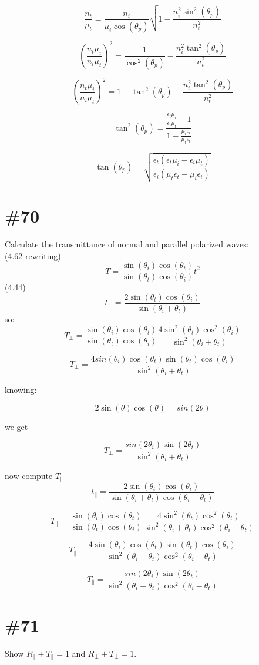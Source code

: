 \documentclass[10pt,a4paper]{article}
\begin{document}
\[\frac{n_t}{\mu_t}=\frac{n_i}{\mu_i\cos(\theta_p)}\sqrt{1-\frac{n_i^2\sin^2(\theta_p)}{n_t^2}}\]

\[(\frac{n_t\mu_i}{n_i\mu_t})^2=\frac{1}{\cos^2(\theta_p)}-\frac{n_i^2\tan^2(\theta_p)}{n_t^2}\]

\[(\frac{n_t\mu_i}{n_i\mu_t})^2=1+\tan^2(\theta_p)-\frac{n_i^2\tan^2(\theta_p)}{n_t^2}\]

\[\tan^2(\theta_p)=\frac{\frac{\epsilon_t\mu_i}{\epsilon_i\mu_t}-1}{1-\frac{\mu_i\epsilon_i}{\mu_t\epsilon_t}}\]

\[\tan(\theta_p)=\sqrt{\frac{\epsilon_t(\epsilon_t\mu_i-\epsilon_i\mu_t)}{\epsilon_i(\mu_t\epsilon_t-\mu_i\epsilon_i)}}\]

\section{\#70}
Calculate the transmittance of normal and parallel polarized waves:\\
(4.62-rewriting)
\[T=\frac{\sin(\theta_i)\cos(\theta_t)}{\sin(\theta_t)\cos(\theta_i)}t^2\]
(4.44)
\[t_\perp=\frac{2\sin(\theta_t)\cos(\theta_i)}{\sin(\theta_i+\theta_t)}\]
so:
\[T_\perp=\frac{\sin(\theta_i)\cos(\theta_t)}{\sin(\theta_t)\cos(\theta_i)}\frac{4\sin^2(\theta_t)\cos^2(\theta_i)}{\sin^2(\theta_i+\theta_t)}\]

\[T_\perp=\frac{4sin(\theta_i)\cos(\theta_t)\sin(\theta_t)\cos(\theta_i)}{\sin^2(\theta_i+\theta_t)}\]

knowing:

\[2\sin(\theta)\cos(\theta)=sin(2\theta)\]

we get

\[T_\perp=\frac{sin(2\theta_i)\sin(2\theta_t)}{\sin^2(\theta_i+\theta_t)}\]

now compute $T_\parallel$
\[t_\parallel=\frac{2\sin(\theta_t)\cos(\theta_i)}{\sin(\theta_i+\theta_t)\cos(\theta_i-\theta_t)}\]

\[T_\parallel=\frac{\sin(\theta_i)\cos(\theta_t)}{\sin(\theta_t)\cos(\theta_i)}\frac{4\sin^2(\theta_t)\cos^2(\theta_i)}{\sin^2(\theta_i+\theta_t)\cos^2(\theta_i-\theta_t)}\]

\[T_\parallel=\frac{4\sin(\theta_i)\cos(\theta_t)\sin(\theta_t)\cos(\theta_i)}{\sin^2(\theta_i+\theta_t)\cos^2(\theta_i-\theta_t)}\]

\[T_\parallel=\frac{sin(2\theta_i)\sin(2\theta_t)}{\sin^2(\theta_i+\theta_t)\cos^2(\theta_i-\theta_t)}\]

\section{\#71}
Show $R_\parallel+T_\parallel=1$ and $R_\perp+T_\perp=1$.
\end{document}
